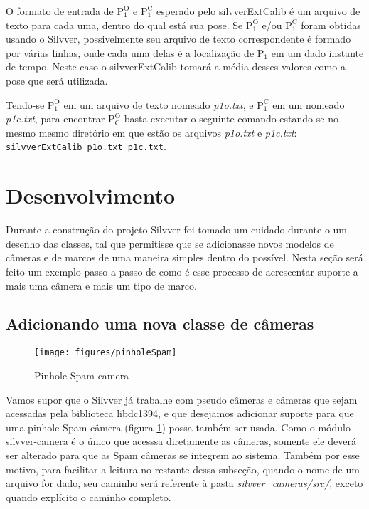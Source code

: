 \documentclass[a4paper,10pt]{article}
\begin{document}
O formato de entrada de $\mathrm{P_1^O}$ e $\mathrm{P_1^C}$ esperado pelo
silvverExtCalib é um arquivo de texto para cada uma, dentro do qual está sua
pose. Se $\mathrm{P_1^O}$ e/ou $\mathrm{P_1^C}$ foram obtidas usando o
Silvver, possivelmente seu arquivo de texto correspondente é formado por
várias linhas, onde cada uma delas é a localização de $\mathrm{P_1}$ em um
dado instante de tempo. Neste caso o silvverExtCalib tomará a média desses
valores como a pose que será utilizada.

Tendo-se $\mathrm{P_1^O}$ em um arquivo de texto nomeado \emph{p1o.txt}, e
$\mathrm{P_1^C}$ em um nomeado \emph{p1c.txt}, para encontrar $\mathrm{P_C^O}$
basta executar o seguinte comando estando-se no mesmo mesmo diretório em que
estão os arquivos \emph{p1o.txt} e \emph{p1c.txt}: \texttt{silvverExtCalib
  p1o.txt p1c.txt}.

\section{Desenvolvimento}

Durante a construção do projeto Silvver foi tomado um cuidado durante o
um desenho das classes, tal que permitisse que se adicionasse novos modelos de
câmeras e de marcos de uma maneira simples dentro do possível. Nesta seção
será feito um exemplo passo-a-passo de como é esse processo de acrescentar
suporte a mais uma câmera e mais um tipo de marco.

\subsection{Adicionando uma nova classe de câmeras}

\begin{figure}[h!]
  \centering
  \texttt{[image: figures/pinholeSpam]}
  \caption{Pinhole Spam camera}
  \label{fig:pinholeSpam}
\end{figure}

Vamos supor que o Silvver já trabalhe com pseudo câmeras e câmeras que sejam
acessadas pela biblioteca libdc1394, e que desejamos adicionar suporte para
que uma pinhole Spam câmera (figura \ref{fig:pinholeSpam}) possa também ser
usada. Como o módulo silvver-camera é o único que acesssa diretamente as
câmeras, somente ele deverá ser alterado para que as Spam câmeras se integrem
ao sistema. Também por esse motivo, para facilitar a leitura no restante dessa
subseção, quando o nome de um arquivo for dado, seu caminho será referente à pasta
\emph{silvver\_cameras/src/}, exceto quando explícito o caminho completo.
\end{document}

